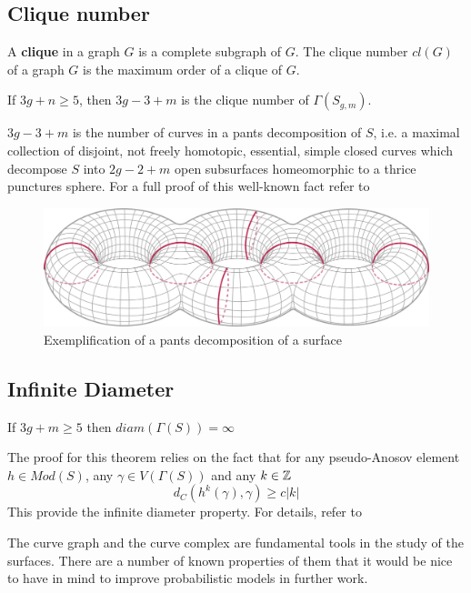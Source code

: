 \subsection{Clique number}
A \textbf{clique} in a graph $G$ is a complete subgraph of $G$. The clique number $cl(G)$ of a graph $G$ is the maximum order of a clique of $G$.

\begin{theorem}
If $3g+n\geq 5$, then $3g - 3 + m$ is the clique number of $\Gamma(S_{g,m})$.
\end{theorem}

$3g-3+m$ is the number of curves in a pants decomposition of $S$, i.e. a maximal collection of disjoint, not freely homotopic, essential, simple closed curves which decompose $S$ into $2g-2+m$ open subsurfaces homeomorphic to a thrice punctures sphere. For a full proof of this well-known fact refer to \cite[Hatcher]{Pants}

\vspace{1cm}
\begin{figure}[h!]
	\centering
	\includegraphics[scale=0.5]{Figures/Pantalones.png}
	\caption{Exemplification of a pants decomposition of a surface}
\end{figure}

\subsection{Infinite Diameter}
\begin{theorem}
If $3g+m\geq 5$ then $diam(\Gamma(S)) = \infty$
\end{theorem}

The proof for this theorem relies on the fact that for any pseudo-Anosov element $h \in Mod(S)$, any $\gamma \in V(\Gamma(S))$ and any $k\in \mathbb{Z}$
$$d_{C}(h^{k}(\gamma), \gamma) \geq c|k|$$
This provide the infinite diameter property. For details, refer to \cite[Masur and Minsky]{Masur}

The curve graph and the curve complex are fundamental tools in the study of the surfaces. There are a number of known properties of them that it would be nice to have in mind to improve probabilistic models in further work.

